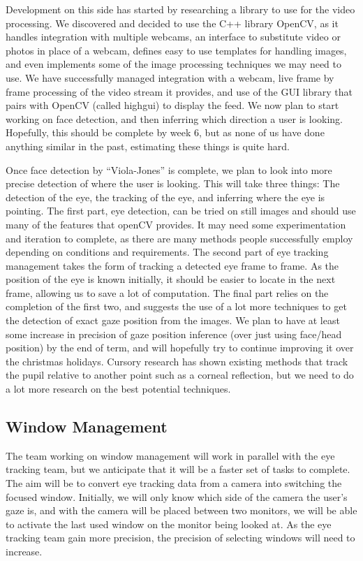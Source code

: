 \documentclass{article}
\begin{document}
Development on this side has started by researching a library to use for the video processing. We discovered and decided to use the C++ library OpenCV, as it handles integration with multiple webcams, an interface to substitute video or photos in place of a webcam, defines easy to use templates for handling images, and even implements some of the image processing techniques we may need to use. We have successfully managed integration with a webcam, live frame by frame processing of the video stream it provides, and use of the GUI library that pairs with OpenCV (called highgui) to display the feed. We now plan to start working on face detection, and then inferring which direction a user is looking. Hopefully, this should be complete by week 6, but as none of us have done anything similar in the past, estimating these things is quite hard.

Once face detection by “Viola-Jones” is complete, we plan to look into more precise detection of where the user is looking. This will take three things: The detection of the eye, the tracking of the eye, and inferring where the eye is pointing. The first part, eye detection, can be tried on still images and should use many of the features that openCV provides. It may need some experimentation and iteration to complete, as there are many methods people successfully employ depending on conditions and requirements. The second part of eye tracking management takes the form of tracking a detected eye frame to frame. As the position of the eye is known initially, it should be easier to locate in the next frame, allowing us to save a lot of computation.  The final part relies on the completion of the first two, and suggests the use of a lot more techniques to get the detection of exact gaze position from the images. We plan to have at least some increase in precision of gaze position inference (over just using face/head position) by the end of term, and will hopefully try to continue improving it over the christmas holidays. Cursory research has shown existing methods that track the pupil relative to another point such as a corneal reflection, but we need to do a lot more research on the best potential techniques.

\subsection*{Window Management}
The team working on window management will work in parallel with the eye tracking team, but we anticipate that it will be a faster set of tasks to complete. The aim will be to convert eye tracking data from a camera into switching the focused window. Initially, we will only know which side of the camera the user’s gaze is, and with the camera will be placed between two monitors, we will be able to activate the last used window on the monitor being looked at. As the eye tracking team gain more precision, the precision of selecting windows will need to increase.
\end{document}
